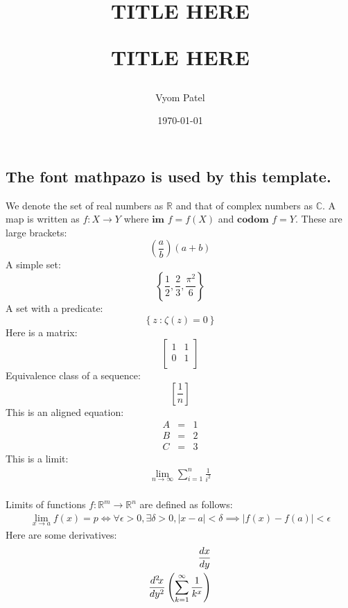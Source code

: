 \documentclass[fleqn]{article}
\title{\textbf{TITLE HERE}
	
	TITLE HERE
}
\author{Vyom Patel}
\date{\today}
\newcommand{\R}{\mathbb{R}}
\newcommand{\C}{\mathbb{C}}
\newcommand{\fn}[3]{#1 : #2 \rightarrow #3}
\newcommand{\br}[1]{\left( #1 \right)}
\newcommand{\curly}[1]{\left\{ #1 \right\}}
\newcommand{\set}[2]{\curly{#1\ \textbf{:}\ #2}}
\newcommand{\im}{\textbf{im }}
\newcommand{\codom}{\textbf{codom }}
\newcommand{\sbr}[1]{\left[ #1 \right]}
\newcommand{\eqn}[1]{\begin{eqnarray*} #1 \end{eqnarray*}}
\newcommand{\abs}[1]{\left| #1 \right|}
\newcommand{\eps}{\epsilon}
\newcommand{\del}{\delta}
\newcommand{\limit}[3]{\lim_{#1 \rightarrow #2}#3}
\newcommand{\bmat}[1]{\ensuremath{\begin{bmatrix} #1 \end{bmatrix}}}
\newcommand{\diff}[3][]{%
	\ifthenelse{\equal{#1}{}}{%
		\ensuremath{\frac{d{#2}}{d{#3}}}%
	}{%
		\ensuremath{\frac{d^{#1}\!{#2}}{d{#3}^{#1}}}%
	}%
}
\begin{document}
	\maketitle
	\subsection{The font mathpazo is used by this template.}
	We denote the set of real numbers as $\R$ and that of complex numbers as
	$\C$.
	A map is written as $\fn{f}{X}{Y}$ where $\im f = f(X)$ and $\codom f = Y$.
	These are large brackets:
	\[
	\br{\frac{a}{b}}\br{a + b}
	\]
	A simple set:
	\[
	\curly{\frac{1}{2}, \frac{2}{3}, \frac{\pi^2}{6}}
	\]
	A set with a predicate:
	\[
	\set{z}{\zeta\br{z} = 0}
	\]
	Here is a matrix:
	\[
	\bmat{
		1 & 1 \\
		0 & 1 \\
	}
	\]
	Equivalence class of a sequence:
	\[
	\sbr{\frac{1}{n}}
	\]
	This is an aligned equation:
	\eqn{
		A &=& 1\\
		B &=& 2\\
		C &=& 3
	}
	This is a limit:
	\eqn{
		\limit{n}{\infty}{\sum_{i = 1}^n \frac{1}{i^2}}
	}
\\

	Limits of functions $\fn{f}{\R^m}{\R^n}$ are defined as follows:
	\eqn{
		\limit{x}{a}{f(x)} = p \iff
		\forall \eps > 0, \exists \del > 0, \abs{x - a} < \del
		\implies \abs{f(x) - f(a)} < \eps
	}
	Here are some derivatives:
	\eqn{
		\diff{x}{y}\\
		\diff[2]{x}{y} \br{\sum_{k = 1}^{\infty}\frac{1}{k^x}}
	}
	
\end{document}

